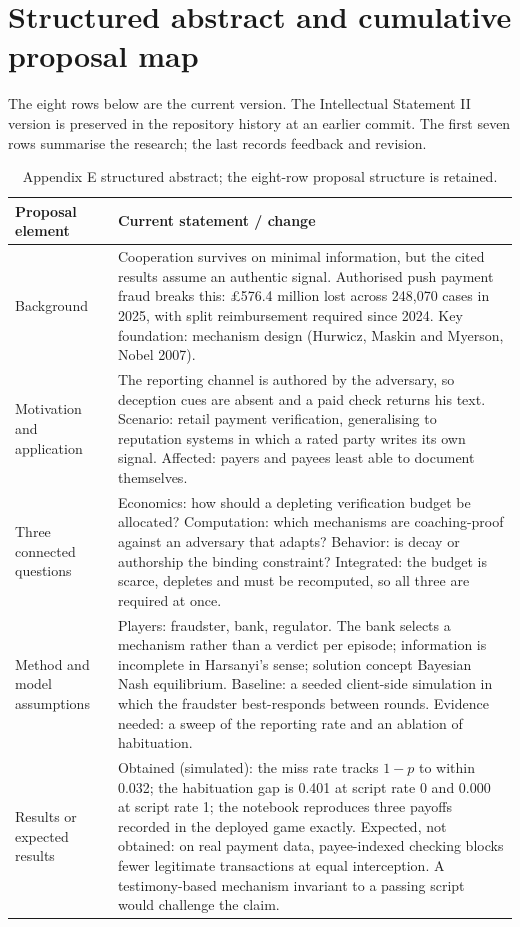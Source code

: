 \section{Structured abstract and cumulative proposal map}\label{app:abstract}
The eight rows below are the current version. The Intellectual Statement II version is preserved in the repository history at an earlier commit. The first seven rows summarise the research; the last records feedback and revision.
\par\medskip
\begin{table}[H]
\caption{Appendix E structured abstract; the eight-row proposal structure is retained.}
\label{tab:abstract-map}
\renewcommand{\arraystretch}{1.18}
\begin{tabularx}{\textwidth}{@{}p{}Y@{}}
\toprule
\textbf{Proposal element} & \textbf{Current statement / change} \\
\midrule
Background & Cooperation survives on minimal information, but the cited results assume an authentic signal. Authorised push payment fraud breaks this: \pounds576.4 million lost across 248,070 cases in 2025, with split reimbursement required since 2024. Key foundation: mechanism design (Hurwicz, Maskin and Myerson, Nobel 2007). \\
Motivation and application & The reporting channel is authored by the adversary, so deception cues are absent and a paid check returns his text. Scenario: retail payment verification, generalising to reputation systems in which a rated party writes its own signal. Affected: payers and payees least able to document themselves. \\
Three connected questions & Economics: how should a depleting verification budget be allocated? Computation: which mechanisms are coaching-proof against an adversary that adapts? Behavior: is decay or authorship the binding constraint? Integrated: the budget is scarce, depletes and must be recomputed, so all three are required at once. \\
Method and model assumptions & Players: fraudster, bank, regulator. The bank selects a mechanism rather than a verdict per episode; information is incomplete in Harsanyi's sense; solution concept Bayesian Nash equilibrium. Baseline: a seeded client-side simulation in which the fraudster best-responds between rounds. Evidence needed: a sweep of the reporting rate and an ablation of habituation. \\
Results or expected results & Obtained (simulated): the miss rate tracks $1-p$ to within 0.032; the habituation gap is 0.401 at script rate 0 and 0.000 at script rate 1; the notebook reproduces three payoffs recorded in the deployed game exactly. Expected, not obtained: on real payment data, payee-indexed checking blocks fewer legitimate transactions at equal interception. A testimony-based mechanism invariant to a passing script would challenge the claim. \\

\end{tabularx}
\end{table}
